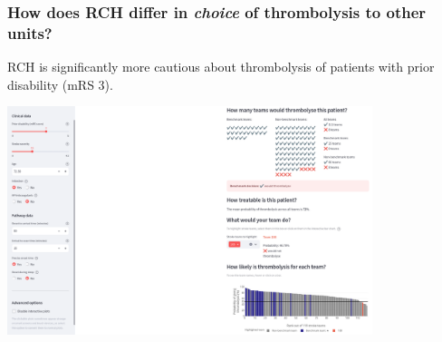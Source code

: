 \begin{frame}
\frametitle{\large{How does RCH differ in \textit{choice} of thrombolysis to other units?}}

\small
RCH is significantly more cautious about thrombolysis of patients with prior disability (mRS 3).

\vspace{3mm}
\begin{center}

\includegraphics[width=0.80\textwidth]{./Truro/truro_mrs3}

\small

    
\end{center}


\end{frame}